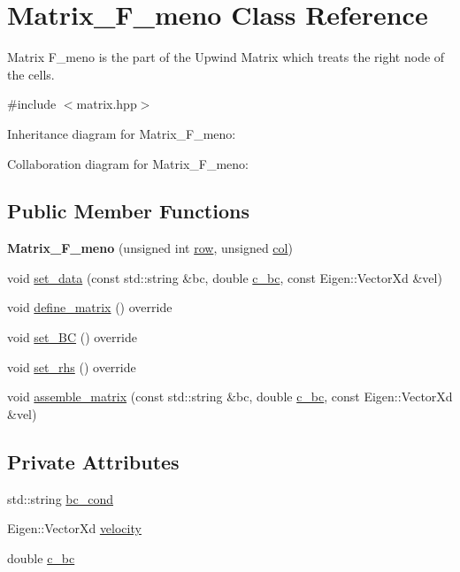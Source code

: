 \hypertarget{classMatrix__F__meno}{}\section{Matrix\+\_\+\+F\+\_\+meno Class Reference}
\label{classMatrix__F__meno}


Matrix F\+\_\+meno is the part of the Upwind Matrix which treats the right node of the cells.  




{\ttfamily \#include $<$matrix.\+hpp$>$}



Inheritance diagram for Matrix\+\_\+\+F\+\_\+meno\+:


Collaboration diagram for Matrix\+\_\+\+F\+\_\+meno\+:
\subsection*{Public Member Functions}
\begin{DoxyCompactItemize}
\item 
\mbox{\label{classMatrix__F__meno_a7f6fd26f5d527f93dc562eb4c3e61990}} 
{\bfseries Matrix\+\_\+\+F\+\_\+meno} (unsigned int \hyperlink{classAbstractMatrix_a27fb46bf2853d4927d92a81b8b7773fb}{row}, unsigned \hyperlink{classAbstractMatrix_af3ad3551ce094979488cef5df0e4fc1d}{col})
\item 
void \hyperlink{classMatrix__F__meno_aab592defd0ec60e5a6acb19e02717dea}{set\+\_\+data} (const std\+::string \&bc, double \hyperlink{classMatrix__F__meno_ac51bf5308b52c9ce9a726cafd0485928}{c\+\_\+bc}, const Eigen\+::\+Vector\+Xd \&vel)
\item 
void \hyperlink{classMatrix__F__meno_a3b660526da87f63e6091cf4422385d94}{define\+\_\+matrix} () override
\item 
void \hyperlink{classMatrix__F__meno_ac8ae0448eb45d2c2996d5cfdb2a587f9}{set\+\_\+\+BC} () override
\item 
void \hyperlink{classMatrix__F__meno_adbe40c5bd77fc92b0db81233797276ca}{set\+\_\+rhs} () override
\item 
void \hyperlink{classMatrix__F__meno_a5e4149e92a5c917a79f542859dc0cb7c}{assemble\+\_\+matrix} (const std\+::string \&bc, double \hyperlink{classMatrix__F__meno_ac51bf5308b52c9ce9a726cafd0485928}{c\+\_\+bc}, const Eigen\+::\+Vector\+Xd \&vel)
\end{DoxyCompactItemize}
\subsection*{Private Attributes}
\begin{DoxyCompactItemize}
\item 
std\+::string \hyperlink{classMatrix__F__meno_a376fb6461d3178c01eecabe7d51901dc}{bc\+\_\+cond}
\item 
Eigen\+::\+Vector\+Xd \hyperlink{classMatrix__F__meno_a635dd00a661ca2453da2392f98422b61}{velocity}
\item 
double \hyperlink{classMatrix__F__meno_ac51bf5308b52c9ce9a726cafd0485928}{c\+\_\+bc}
\end{DoxyCompactItemize}
